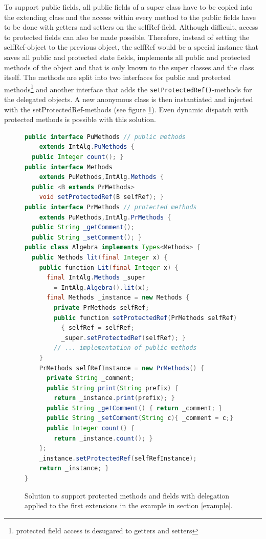 \documentclass{report}
\begin{document}
To support public fields, all public fields of a super class have to be copied into the extending class and the access within every method to the public fields have to be done with getters and setters on the selfRef-field.
Although difficult, access to protected fields can also be made possible. Therefore, instead of setting the selfRef-object to the previous object, the selfRef would be a special instance that saves all public and protected state fields, implements all public and protected methods of the object and that is only known to the super classes and the class itself. The methods are split into two interfaces for public and protected methods\footnote{protected field access is desugared to getters and setters} and another interface that adds the \lstinline{setProtectedRef()}-methods for the delegated objects. A new anonymous class is then instantiated and injected with the setProtectedRef-methods (see figure \ref{visibilitySupportSolution}). Even dynamic dispatch with protected methods is possible with this solution.

\begin{figure}[H]
\begin{lstlisting}[language=java]
public interface PuMethods // public methods
    extends IntAlg.PuMethods {
  public Integer count(); }
public interface Methods
    extends PuMethods,IntAlg.Methods {
  public <B extends PrMethods>
    void setProtectedRef(B selfRef); }
public interface PrMethods // protected methods
    extends PuMethods,IntAlg.PrMethods {
  public String _getComment();
  public String _setComment(); }
public class Algebra implements Types<Methods> {
  public Methods lit(final Integer x) {
    public function Lit(final Integer x) {
      final IntAlg.Methods _super
        = IntAlg.Algebra().lit(x);
      final Methods _instance = new Methods {
        private PrMethods selfRef;
        public function setProtectedRef(PrMethods selfRef)
          { selfRef = selfRef;
          _super.setProtectedRef(selfRef); }
        // ... implementation of public methods
    }
    PrMethods selfRefInstance = new PrMethods() {
      private String _comment;
      public String print(String prefix) {
        return _instance.print(prefix); }
      public String _getComment() { return _comment; }
      public String _setComment(String c){ _comment = c;}
      public Integer count() {
        return _instance.count(); }
    };
    _instance.setProtectedRef(selfRefInstance);
    return _instance; }
}
\end{lstlisting}
\caption{Solution to support protected methods and fields with delegation applied to the first extensions in the example in section \ref{example}.}
\label{visibilitySupportSolution}
\end{figure}
\end{document}
